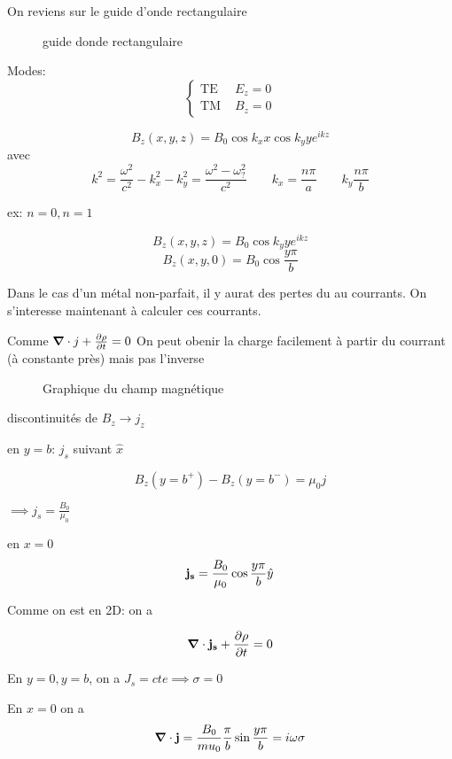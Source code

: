 



On reviens sur le guide d'onde rectangulaire

\begin{figure}[ht]
    \centering
    \caption{guide donde rectangulaire}
    \label{fig:guide-donde-rectangulaire}
\end{figure}

Modes:
$$\begin{cases}
	\text{TE} & E_{z} =0 \\
	\text{TM } & B_{z} =0 
\end{cases}$$ 


$$B_{z}(x,y,z) = B_{0} \cos k_{x} x \cos k_{y} y e^{ikz} $$ 
avec $$k^2 = \frac{\omega^2}{c^2} -k_{x}^2 -k_{y}^2 = \frac{\omega^2-\omega_{?}^2}{c^2} \qquad k_{x} = \frac{n\pi}{a} \qquad k_{y} \frac{n\pi}{b} $$ 

ex: $n=0, n=1$


$$B_z(x,y,z) = B_{0} \cos k_{y} y e^{ikz}$$ 
$$B_z(x,y,0)=B_{0} \cos \frac{y\pi}{b} $$ 


Dans le cas d'un métal non-parfait, il y aurat des pertes du au courrants. On s'interesse maintenant à calculer ces courrants.

Comme $\grad \cdot j + \frac{\partial\rho}{\partial t} = 0$ On peut obenir la charge facilement à partir du courrant (à constante près) mais pas l'inverse 

\begin{figure}[ht]
    \centering
    \caption{Graphique du champ magnétique}
    \label{fig:graphique-du-champ-magnétique}
\end{figure}

discontinuités de $B_{z} \to j_z$ 

en $y=b$: $j_{s}$ suivant $\hat x$   

$$B_z(y = b^+)-B_z(y=b^-) = \mu_{0} j$$ 

$\implies j_{s} = \frac{B_{0}}{\mu_{0}} $ 

en $x=0$ $$\vb{j_s} = \frac{B_{0}}{\mu_{0}} \cos\frac{y\pi}{b} \hat y$$  

Comme on est en 2D: on a 

$$\grad \cdot \vb{j_s} + \pdv{\rho}{t} = 0$$ 

En $y = 0, y = b$, on a $J_{s} = cte \implies \sigma=0$  

En $x = 0$ on a $$\grad \cdot \vb{j} = \frac{B_{0}}{mu_0} \frac{\pi}{b} \sin \frac{y\pi}{b} =i\omega\sigma$$  


